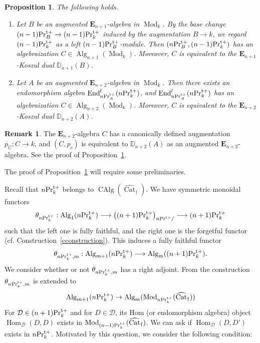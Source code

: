 \documentclass[leqno,12pt]{amsart}
\theoremstyle{plain}
\newtheorem{Proposition}[Theorem]{Proposition}
\theoremstyle{definition}
\newtheorem{Remark}[Theorem]{Remark}
\newcommand{\DD}{\mathbb{D}}
\newcommand{\DDD}{\mathcal{D}}
\newcommand{\PRTT}{\textup{Pr}^{\textup{t}+}}
\newcommand{\Hom}{\operatorname{Hom}}
\newcommand{\Mod}{\operatorname{Mod}}
\newcommand{\Alg}{\operatorname{Alg}}
\newcommand{\End}{\operatorname{End}}
\newcommand{\CAlg}{\operatorname{CAlg}}
\newcommand{\vCat}{\widehat{\operatorname{Cat}}_\dagger}
\begin{document}
\begin{Proposition}
\label{endoalgebraization}
The following holds.

\begin{enumerate}

\item 
Let $B$ be an augmented $\mathbf{E}_{n+1}$-algebra in $\Mod_k$.
By the base change $(n-1)\PRTT_B\to (n-1)\PRTT_k$ induced by the augmentation $B\to k$,
we regard $(n-1)\PRTT_k$ as a left $(n-1)\PRTT_B$-module.
Then  $(n\PRTT_B,(n-1)\PRTT_k)$ has an algebraization $C\in \Alg_{n+1}(\Mod_k)$.
Moreover, $C$ is equivalent to the $\mathbf{E}_{n+1}$-Koszul dual $\DD_{n+1}(B)$.

\item
Let $A$ be an augmented $\mathbf{E}_{n+2}$-algebra in $\Mod_k$.
Then there exists an endomorphism algebra $\End_{n\PRTT_A}^l(n\PRTT_k)$, and $\End_{n\PRTT_A}^l(n\PRTT_k)$ has an algebraization $C\in \Alg_{n+2}(\Mod_k)$.
Moreover, $C$ is equivalent to the $\mathbf{E}_{n+2}$-Koszul dual $\DD_{n+2}(A)$.

\end{enumerate}
\end{Proposition}


\begin{Remark}
The $\mathbf{E}_{n+2}$-algebra $C$ has a canonically defined augmentation $p_C:C\to k$,
and $(C,p_c)$ is equivalent to $\DD_{n+2}(A)$ as an augmented $\mathbf{E}_{n+2}$-algebra. See the proof of Proposition~\ref{endoalgebraization}.
\end{Remark}

The proof of Proposition~\ref{endoalgebraization} will require some preliminaries.



Recall that $n\PRTT_k$ belongs to $\CAlg(\vCat)$.
We have symmetric monoidal functors
\[
\theta_{n\PRTT_k}:\Alg_1(n\PRTT_k) \longrightarrow \big{(}(n+1)\PRTT_k\big{)}_{n\PRTT/}\longrightarrow (n+1)\PRTT_k
\]
such that the left one is fully faithful, and the right one is the forgetful functor (cf. Construction~\ref{cconstruction}).
This induces a fully faithful functor 
\[
\theta_{n\PRTT_k,m}:\Alg_{m+1}(n\PRTT_k) \longrightarrow \Alg_{m}((n+1)\PRTT_k).
\]
We consider whether or not $\theta_{n\PRTT_k,m}$ has a right adjoint.
From the construction $\theta_{n\PRTT_k,m}$ is extended to
\[
\Alg_{m+1}(n\PRTT_k) \to \Alg_{m}(\Mod_{n\PRTT_k}(\vCat))
\]
For $\DDD\in(n+1)\PRTT_k$ and for $D\in \DDD$, its Hom (or endomorphism algebra) object 
$\Hom_{\DDD}(D,D)$ exists in $\Mod_{(n-1)\PRTT_k}(\vCat)$.
We can ask if $\Hom_{\DDD}(D,D')$ exists in $n\PRTT_k$.
Motivated by this question, we consider the following condition: 
\end{document}
